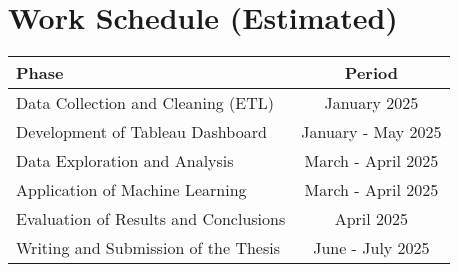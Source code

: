 \section{Work Schedule (Estimated)}

\begin{tabular}{|l|c|}
\hline
\textbf{Phase} & \textbf{Period} \\
\hline
Data Collection and Cleaning (ETL) & January 2025 \\
Development of Tableau Dashboard & January - May 2025 \\
Data Exploration and Analysis & March - April 2025 \\
Application of Machine Learning & March - April 2025 \\
Evaluation of Results and Conclusions & April 2025 \\
Writing and Submission of the Thesis & June - July 2025 \\
\hline
\end{tabular}